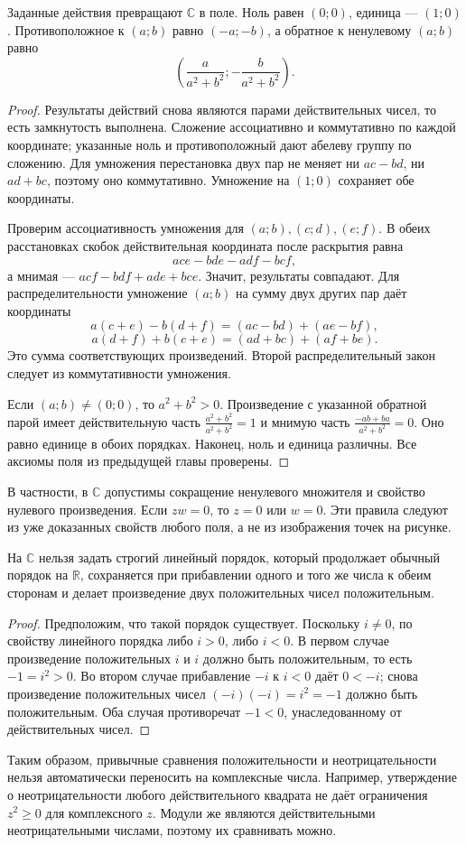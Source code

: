 \begin{theorem}\label{thm:legacy-c23-1}
Заданные действия превращают \(\mathbb C\) в поле. Ноль равен \((0;0)\), единица — \((1;0)\). Противоположное к \((a;b)\) равно \((-a;-b)\), а обратное к ненулевому \((a;b)\) равно
\[
\left(\frac a{a^2+b^2};-\frac b{a^2+b^2}\right).
\]
\end{theorem}
\begin{proof}
Результаты действий снова являются парами действительных чисел, то есть замкнутость выполнена. Сложение ассоциативно и коммутативно по каждой координате; указанные ноль и противоположный дают абелеву группу по сложению. Для умножения перестановка двух пар не меняет ни \(ac-bd\), ни \(ad+bc\), поэтому оно коммутативно. Умножение на \((1;0)\) сохраняет обе координаты.

Проверим ассоциативность умножения для \((a;b),(c;d),(e;f)\). В обеих расстановках скобок действительная координата после раскрытия равна
\[
ace-bde-adf-bcf,
\]
а мнимая — \(acf-bdf+ade+bce\). Значит, результаты совпадают. Для распределительности умножение \((a;b)\) на сумму двух других пар даёт координаты
\[
a(c+e)-b(d+f)=(ac-bd)+(ae-bf),
\]
\[
a(d+f)+b(c+e)=(ad+bc)+(af+be).
\]
Это сумма соответствующих произведений. Второй распределительный закон следует из коммутативности умножения.

Если \((a;b)\ne(0;0)\), то \(a^2+b^2>0\). Произведение с указанной обратной парой имеет действительную часть \(\frac{a^2+b^2}{a^2+b^2}=1\) и мнимую часть \(\frac{-ab+ba}{a^2+b^2}=0\). Оно равно единице в обоих порядках. Наконец, ноль и единица различны. Все аксиомы поля из предыдущей главы проверены.
\end{proof}
В частности, в \(\mathbb C\) допустимы сокращение ненулевого множителя и свойство нулевого произведения. Если \(zw=0\), то \(z=0\) или \(w=0\). Эти правила следуют из уже доказанных свойств любого поля, а не из изображения точек на рисунке.

\begin{theorem}\label{thm:legacy-c23-2}
На \(\mathbb C\) нельзя задать строгий линейный порядок, который продолжает обычный порядок на \(\mathbb R\), сохраняется при прибавлении одного и того же числа к обеим сторонам и делает произведение двух положительных чисел положительным.
\end{theorem}
\begin{proof}
Предположим, что такой порядок существует. Поскольку \(i\ne0\), по свойству линейного порядка либо \(i>0\), либо \(i<0\). В первом случае произведение положительных \(i\) и \(i\) должно быть положительным, то есть \(-1=i^2>0\). Во втором случае прибавление \(-i\) к \(i<0\) даёт \(0<-i\); снова произведение положительных чисел \((-i)(-i)=i^2=-1\) должно быть положительным. Оба случая противоречат \(-1<0\), унаследованному от действительных чисел.
\end{proof}
Таким образом, привычные сравнения положительности и неотрицательности нельзя автоматически переносить на комплексные числа. Например, утверждение о неотрицательности любого действительного квадрата не даёт ограничения \(z^2\ge0\) для комплексного \(z\). Модули же являются действительными неотрицательными числами, поэтому их сравнивать можно.

